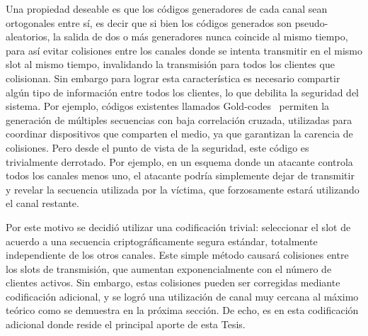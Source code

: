 Una propiedad deseable es que los códigos generadores de cada canal sean ortogonales entre sí, es decir que si bien los códigos generados son pseudo-aleatorios, la salida de dos o más generadores nunca coincide al mismo tiempo, para así evitar colisiones entre los canales donde se intenta transmitir en el mismo slot al mismo tiempo, invalidando la transmisión para todos los clientes que colisionan.
Sin embargo para lograr esta característica es necesario compartir algún tipo de información entre todos los clientes, lo que debilita la seguridad del sistema. Por ejemplo, códigos existentes llamados Gold-codes~\cite{gold1967optimal} permiten la generación de múltiples secuencias con baja correlación cruzada, utilizadas para coordinar dispositivos que comparten el medio, ya que garantizan la carencia de colisiones. Pero desde el punto de vista de la seguridad, este código es trivialmente derrotado. Por ejemplo, en un esquema donde un atacante controla todos los canales menos uno, el atacante podría simplemente dejar de transmitir y revelar la secuencia utilizada por la víctima, que forzosamente estará utilizando el canal restante.

Por este motivo se decidió utilizar una codificación trivial: seleccionar el slot de acuerdo a una secuencia criptográficamente segura estándar, totalmente independiente de los otros canales. Este simple método causará colisiones entre los slots de transmisión, que aumentan exponencialmente con el número de clientes activos. Sin embargo, estas colisiones pueden ser corregidas mediante codificación adicional, y se logró una utilización de canal muy cercana al máximo teórico como se demuestra en la próxima sección. De echo, es en esta codificación adicional donde reside el principal aporte de esta Tesis.

